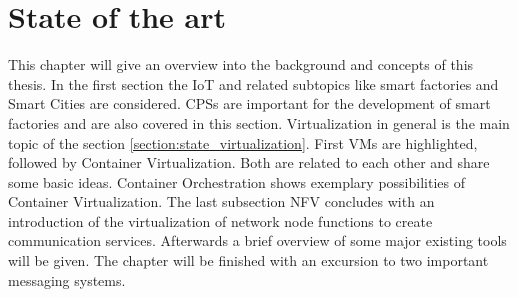 


\chapter{State of the art}
\label{chapter:state-of-the-art}
\minitoc\vspace{.5cm}

This chapter will give an overview into the background and concepts of this thesis.
In the first section the \ac{IoT} and related subtopics like smart factories and Smart Cities are considered.
\acp{CPS} are important for the development of smart factories and are also covered in this section.
Virtualization in general is the main topic of the section \ref{section:state_virtualization}.
First \acp{VM} are highlighted, followed by Container Virtualization.
Both are related to each other and share some basic ideas.
Container Orchestration shows exemplary possibilities of Container Virtualization.
The last subsection \ac{NFV} concludes with an introduction of the virtualization of network node functions to create communication services.
Afterwards a brief overview of some major existing tools will be given.
The chapter will be finished with an excursion to two important messaging systems.


